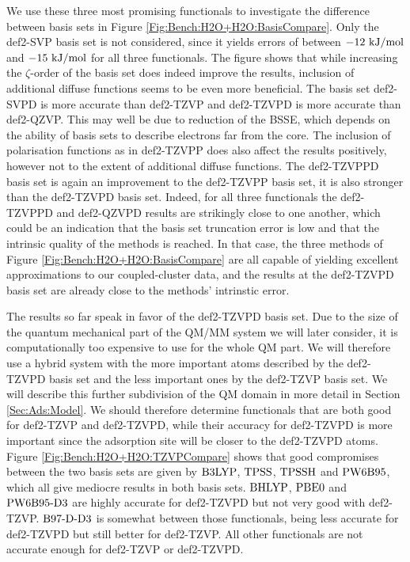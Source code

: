 \documentclass[8.5pt,twoside,twocolumn]{article}
\newcommand\kmo{\enmat{\te {kJ/mol}}}
\theoremstyle{standard}
\begin{document}
We use these three most promising functionals to investigate the difference
between basis sets in Figure \ref{Fig:Bench:H2O+H2O:BasisCompare}. Only the def2-SVP basis set is not
considered, since it yields errors of between $-12\ \kmo$ and $-15\ \kmo$ for all three
functionals. The figure shows that while increasing the $\zeta$-order of the basis set
does indeed improve the results, inclusion of additional diffuse functions seems to
be even more beneficial. The basis set def2-SVPD is more accurate than def2-TZVP and
def2-TZVPD is more accurate than def2-QZVP.
This may well be due to reduction of the BSSE, which depends on the ability
of basis sets to describe electrons far from the core.
The inclusion of polarisation functions as in def2-TZVPP does
also affect the results positively, however not to the extent of additional
diffuse functions. The def2-TZVPPD basis set is again an improvement
to the def2-TZVPP basis set, it is also stronger than the def2-TZVPD
basis set. Indeed, for all three functionals the def2-TZVPPD and
def2-QZVPD results are strikingly close to one another, which could
be an indication that the basis set truncation error is low and that
the intrinsic quality of the methods is reached. In that case, the
three methods of Figure \ref{Fig:Bench:H2O+H2O:BasisCompare} are all
capable of yielding excellent approximations to our coupled-cluster data,
and the results at the def2-TZVPD basis set are already close to the
methods' intrinstic error.  

The results so far speak in favor of the def2-TZVPD basis set. Due 
to the size of the quantum mechanical part of the QM/MM system we will later consider,
it is computationally too expensive to use for the whole
QM part. We will therefore use a hybrid system with the more important atoms described by the def2-TZVPD
basis set and the less important ones by the def2-TZVP basis set. We will describe this
further subdivision of the QM domain in more detail in Section \ref{Sec:Ads:Model}.
We should therefore determine functionals that are both good for def2-TZVP and def2-TZVPD,
while their accuracy for def2-TZVPD is more important since the adsorption site will
be closer to the def2-TZVPD atoms. Figure \ref{Fig:Bench:H2O+H2O:TZVPCompare} shows
that good compromises between the two basis sets
are given by $\text{B3LYP}$, $\text{TPSS}$, $\text{TPSSH}$ and $\text{PW6B95}$, which all give mediocre results in
both basis sets. $\text{BHLYP}$, $\text{PBE0}$ and $\text{PW6B95}\text{-D3}$ are highly accurate for def2-TZVPD but not very good
with def2-TZVP. $\text{B97-D}\text{-D3}$ is somewhat between those functionals, being less accurate for 
def2-TZVPD but still better for def2-TZVP. All other functionals are
not accurate enough for def2-TZVP or def2-TZVPD.
\end{document}
